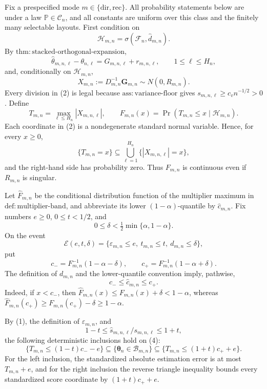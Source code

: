 Fix a prespecified mode \(m\in\{\mathrm{dir},\mathrm{rec}\}\).  All probability statements below are under a law \(\mathbb P\in\mathcal C_n\), and all constants are uniform over this class and the finitely many selectable layouts.  First condition on
\[
 \mathcal H_{m,n}=\sigma(\mathcal F_n,\widehat d_{m,n}).
\]
By \(\mathrm{thm{:}stacked\mbox{-}orthogonal\mbox{-}expansion}\),
\[
 \widehat\theta_{m,n,\ell}-\theta_{n,\ell}
 =G_{m,n,\ell}+r_{m,n,\ell},
 \qquad 1\le \ell\le H_n,                                      \tag{1}
\]
and, conditionally on \(\mathcal H_{m,n}\),
\[
 X_{m,n}:=D_{m,n}^{-1}\boldsymbol G_{m,n}
 \sim N(0,R_{m,n}).                                               \tag{2}
\]
Every division in (2) is legal because \(\mathrm{ass{:}variance\mbox{-}floor}\) gives \(s_{m,n,\ell}\ge c_vn^{-1/2}>0\).  Define
\[
 T_{m,n}=\max_{\ell\le H_n}|X_{m,n,\ell}|,
 \qquad
 F_{m,n}(x)=\Pr(T_{m,n}\le x\mid\mathcal H_{m,n}).               \tag{3}
\]
Each coordinate in (2) is a nondegenerate standard normal variable.  Hence, for every \(x\ge0\),
\[
 \{T_{m,n}=x\}\subseteq
 \bigcup_{\ell=1}^{H_n}\{|X_{m,n,\ell}|=x\},
\]
and the right-hand side has probability zero.  Thus \(F_{m,n}\) is continuous even if \(R_{m,n}\) is singular.

Let \(\widehat F_{m,n}\) be the conditional distribution function of the multiplier maximum in \(\mathrm{def{:}multiplier\mbox{-}band}\), and abbreviate its lower \((1-\alpha)\)-quantile by \(\widehat c_{m,n}\).  Fix numbers \(e\ge0\), \(0\le t<1/2\), and
\[
 0\le\delta<\tfrac12\min\{\alpha,1-\alpha\}.
\]
On the event
\[
 \mathcal E(e,t,\delta)=
 \{\varepsilon_{m,n}\le e,\ t_{m,n}\le t,\ d_{m,n}\le\delta\}, \tag{4}
\]
put
\[
 c_-=F_{m,n}^{-1}(1-\alpha-\delta),
 \qquad
 c_+=F_{m,n}^{-1}(1-\alpha+\delta).                               \tag{5}
\]
The definition of \(d_{m,n}\) and the lower-quantile convention imply, pathwise,
\[
 c_-\le\widehat c_{m,n}\le c_+.                                  \tag{6}
\]
Indeed, if \(x<c_-\), then \(\widehat F_{m,n}(x)\le F_{m,n}(x)+\delta<1-\alpha\), whereas \(\widehat F_{m,n}(c_+)\ge F_{m,n}(c_+)-\delta\ge1-\alpha\).

By (1), the definition of \(\varepsilon_{m,n}\), and
\[
 1-t\le \widehat s_{m,n,\ell}/s_{m,n,\ell}\le1+t,
\]
the following deterministic inclusions hold on (4):
\[
 \{T_{m,n}\le(1-t)c_- -e\}
 \subseteq\{\boldsymbol\theta_n\in\mathcal B_{m,n}\}
 \subseteq\{T_{m,n}\le(1+t)c_+ +e\}.                             \tag{7}
\]
For the left inclusion, the standardized absolute estimation error is at most \(T_{m,n}+e\), and for the right inclusion the reverse triangle inequality bounds every standardized score coordinate by \((1+t)c_++e\).

